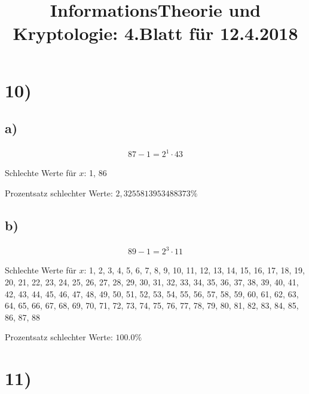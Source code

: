 \documentclass[11pt,a4paper]{article}
\author{}
\begin{document}
  \title{InformationsTheorie und Kryptologie: 4.Blatt für 12.4.2018}
  \maketitle

  \section*{10)}



  

  \subsection*{a)}

  \begin{align*}
    87 - 1 = 2^{1} \cdot 43
  \end{align*}

  Schlechte Werte für $x$: 1, 86

  Prozentsatz schlechter Werte: $2,3255813953488373 \%$

  \subsection*{b)}

  \begin{align*}
    89 - 1 = 2^{3} \cdot 11
  \end{align*}

  Schlechte Werte für $x$: 1, 2, 3, 4, 5, 6, 7, 8, 9, 10, 11, 12, 13, 14, 15, 16, 17, 18, 19, 20, 21, 22, 23, 24, 25, 26, 27, 28, 29, 30, 31, 32, 33, 34, 35, 36, 37, 38, 39, 40, 41, 42, 43, 44, 45, 46, 47, 48, 49, 50, 51, 52, 53, 54, 55, 56, 57, 58, 59, 60, 61, 62, 63, 64, 65, 66, 67, 68, 69, 70, 71, 72, 73, 74, 75, 76, 77, 78, 79, 80, 81, 82, 83, 84, 85, 86, 87, 88

  Prozentsatz schlechter Werte: $100.0 \%$


  \section*{11)}
\end{document}
